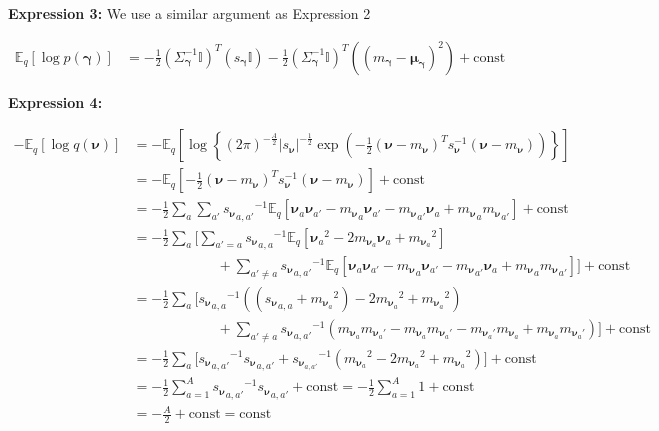 \documentclass[letterpaper,12pt]{article}
\newcommand{\lc}{\left \{} %
\newcommand{\rc}{\right \}} %
\newcommand{\lp}{\left (} %
\newcommand{\rp}{\right )} %
\newcommand{\lb}{\left [} %
\newcommand{\rb}{\right ]} %
\newcommand{\nuv}{\boldsymbol{\nu}} %
\newcommand{\gammav}{\boldsymbol{\gamma}} %
\newcommand{\Sigmagamma}{\Sigma_{\gammav}} %
\newcommand{\mnu}{\ensuremath{m_\nuv}} %
\newcommand{\snu}{\ensuremath{s_\nuv}} %
\newcommand{\nua}{\ensuremath{\nuv_a}} %
\newcommand{\mnusub}[1]{\ensuremath{m_{\nuv_#1}}} %
\newcommand{\E}{\mathbb{E}_q}
\begin{document}
\textbf{Expression 3:} We use a similar argument as Expression 2

\begin{equation}
\begin{split}
    \E \lb \log p(\gammav) \rb &= - \frac{1}{2} (\Sigmagamma^{-1} \mathbb{I} )^T (s_{\gammav} \mathbb{I}) - \frac{1}{2} (\Sigmagamma^{-1} \mathbb{I} )^T \lp (m_{\gammav} - \boldsymbol{\mu}_{\gammav} )^2\rp + \textrm{const}
\end{split}
\end{equation}

\textbf{Expression 4:}

\begin{equation}
\begin{split}
    - \E \lb \log q(\nuv) \rb &= -   \E \lb \log \lc (2 \pi)^{-\frac{A}{2}} | s_{\nuv} | ^{- \frac{1}{2}} \exp \lp - \frac{1}{2} (\nuv - {\mnu})^T s_{\nuv}^{-1} (\nuv - {\mnu})\rp \rc \rb \\
    &= -   \E \lb - \frac{1}{2} (\nuv - {\mnu})^T s_{\nuv}^{-1} (\nuv - {\mnu}) \rb + \textrm{const}\\
    &= - \frac{1}{2} \sum_a \sum_{a'} {\snu_{a,a'}}^{-1} \E \lb \nuv_a \nuv_{a'} - {\mnu_a} \nuv_{a'} - {\mnu_{a'}} \nuv_a + {\mnu_a} {\mnu_{a'}} \rb + \textrm{const} \\
    &= - \frac{1}{2} \sum_a \Bigg[ \sum_{a' = a}  {\snu_{a,a}}^{-1} \E \lb \nua^2 - 2 \mnusub{a} \nua + \mnusub{a}^2 \rb \\
    & \qquad \qquad \qquad + \sum_{a' \neq a}  {\snu_{a,a'}}^{-1} \E \lb \nuv_a \nuv_{a'} - {\mnu_a} \nuv_{a'} - {\mnu_{a'}} \nuv_a + {\mnu_a} {\mnu_{a'}} \rb \Bigg] + \textrm{const} \\
    &= - \frac{1}{2} \sum_a \Bigg[  {\snu_{a,a}}^{-1} \lp \lp {\snu_{a,a}} + \mnusub{a}^2\rp - 2 \mnusub{a}^2 + \mnusub{a}^2 \rp \\
    & \qquad \qquad \qquad + \sum_{a' \neq a}  {\snu_{a,a'}}^{-1} \lp \mnusub{a} \mnusub{a'} - \mnusub{a} \mnusub{a'} - \mnusub{a'} \mnusub{a} + \mnusub{a} \mnusub{a'}\rp \Bigg] + \textrm{const} \\
    &= - \frac{1}{2} \sum_a \Bigg[ {\snu_{a,a'}}^{-1} {\snu_{a,a'}} + {s_{\nuv}_{a,a'}}^{-1} \lp  \mnusub{a}^2 - 2 \mnusub{a}^2 + \mnusub{a}^2 \rp \Bigg] + \textrm{const} \\
    &= - \frac{1}{2} \sum_{a=1}^A {\snu_{a,a'}}^{-1} {\snu_{a,a'}} + \textrm{const} = - \frac{1}{2} \sum_{a=1}^A 1 + \textrm{const} \\
    &= - \frac{  A}{2} + \textrm{const} = \textrm{const}
\end{split}
\end{equation}
\end{document}
